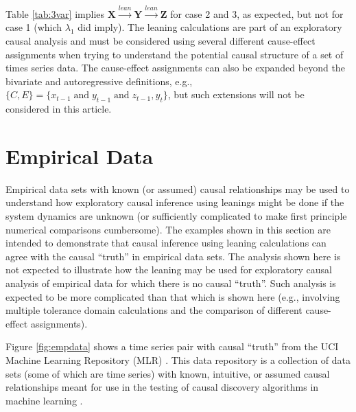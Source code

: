 \documentclass[twocolumn,aps,pre,groupedaddress]{revtex4-1}
\begin{document}
Table \ref{tab:3var} implies $\mathbf{X}\xrightarrow{lean}\mathbf{Y}\xrightarrow{lean}\mathbf{Z}$ for case 2 and 3, as expected, but not for case 1 (which $\lambda_1$ did imply).  The leaning calculations are part of an exploratory causal analysis and must be considered using several different cause-effect assignments when trying to understand the potential causal structure of a set of times series data.  The cause-effect assignments can also be expanded beyond the bivariate and autoregressive definitions, e.g., $\{C,E\} = \{x_{t-1}\;\mathrm{ and }\;y_{t-1}\;\mathrm{ and }\;z_{t-1},y_t\}$, but such extensions will not be considered in this article.

\section{Empirical Data}
Empirical data sets with known (or assumed) causal relationships may be used to understand how exploratory causal inference using leanings might be done if the system dynamics are unknown (or sufficiently complicated to make first principle numerical comparisons cumbersome).  The examples shown in this section are intended to demonstrate that causal inference using leaning calculations can agree with the causal ``truth'' in empirical data sets.  The analysis shown here is not expected to illustrate how the leaning may be used for exploratory causal analysis of empirical data for which there is no causal ``truth''.  Such analysis is expected to be more complicated than that which is shown here (e.g., involving multiple tolerance domain calculations and the comparison of different cause-effect assignments).

Figure \ref{fig:empdata} shows a time series pair with causal ``truth'' from the UCI Machine Learning Repository (MLR) \cite{bache2013}.  This data repository is a collection of data sets (some of which are time series) with known, intuitive, or assumed causal relationships meant for use in the testing of causal discovery algorithms in machine learning \cite{bache2013}.  
\end{document}
